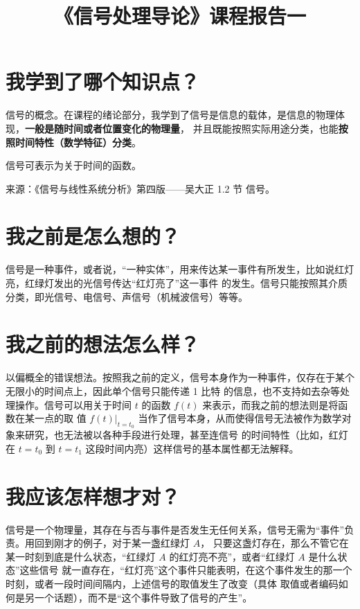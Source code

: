 \documentclass{ctexart}
\title{《信号处理导论》课程报告一}
\begin{document}
    \maketitle

    \section{我学到了哪个知识点？}

    信号的概念。在课程的绪论部分，我学到了信号是信息的载体，是信息的物理体现，\textbf{一般是随时间或者位置变化的物理量}，
    并且既能按照实际用途分类，也能\textbf{按照时间特性（数学特征）分类}。

    信号可表示为关于时间的函数。

    来源：《信号与线性系统分析》第四版——吴大正 1.2 节 信号。

    \section{我之前是怎么想的？}

    信号是一种事件，或者说，“一种实体”，用来传达某一事件有所发生，比如说红灯亮，红绿灯发出的光信号传达“红灯亮了”这一事件
    的发生。信号只能按照其介质分类，即光信号、电信号、声信号（机械波信号）等等。

    \section{我之前的想法怎么样？}

    以偏概全的错误想法。按照我之前的定义，信号本身作为一种事件，仅存在于某个无限小的时间点上，因此单个信号只能传递 1 比特
    的信息，也不支持如去杂等处理操作。信号可以用关于时间 $t$ 的函数 $f(t)$ 来表示，而我之前的想法则是将函数在某一点的取
    值 $f(t) | _{t=t_0}$ 当作了信号本身，从而使得信号无法被作为数学对象来研究，也无法被以各种手段进行处理，甚至连信号
    的时间特性（比如，红灯在 $t=t_0$ 到 $t=t_1$ 这段时间内亮）这样信号的基本属性都无法解释。

    \section{我应该怎样想才对？}

    信号是一个物理量，其存在与否与事件是否发生无任何关系，信号无需为“事件”负责。用回到刚才的例子，对于某一盏红绿灯 $A$，
    只要这盏灯存在，那么不管它在某一时刻到底是什么状态，“红绿灯 $A$ 的红灯亮不亮”，或者“红绿灯 $A$ 是什么状态”这些信号
    就一直存在，“红灯亮”这个事件只能表明，在这个事件发生的那一个时刻，或者一段时间间隔内，上述信号的取值发生了改变（具体
    取值或者编码如何是另一个话题），而不是“这个事件导致了信号的产生”。
\end{document}
